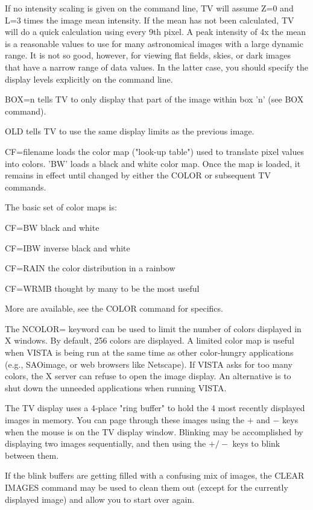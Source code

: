 If no intensity scaling is given on the command line, TV will assume Z=0
and L=3 times the image mean intensity.  If the mean has not been
calculated, TV will do a quick calculation using every 9th pixel.  A peak
intensity of 4x the mean is a reasonable values to use for many
astronomical images with a large dynamic range.  It is not so good,
however, for viewing flat fields, skies, or dark images that have a narrow
range of data values.  In the latter case, you should specify the display
levels explicitly on the command line.
 
BOX=n tells TV to only display that part of the image within box 'n'
(see BOX command).
 
OLD tells TV to use the same display limits as the previous image.
 
CF=filename loads the color map ("look-up table") used to translate
pixel values into colors.  'BW' loads a black and white color map.  Once
the map is loaded, it remains in effect until changed by either the
COLOR or subsequent TV commands.
 
The basic set of color maps is:
\begin{example}
  \item[CF=BW\hfill]{black and white}
  \item[CF=IBW\hfill]{inverse black and white}
  \item[CF=RAIN\hfill]{the color distribution in a rainbow}
  \item[CF=WRMB\hfill]{thought by many to be the most useful}
\end{example}
More are available, see the COLOR command for specifics.

The NCOLOR= keyword can be used to limit the number of colors displayed in
X windows.  By default, 256 colors are displayed.  A limited color map is
useful when VISTA is being run at the same time as other color-hungry
applications (e.g., SAOimage, or web browsers like Netscape).  If VISTA
asks for too many colors, the X server can refuse to open the image
display.  An alternative is to shut down the unneeded applications when
running VISTA.

The TV display uses a 4-place "ring buffer" to hold the 4 most recently
displayed images in memory.  You can page through these images using the
$+$ and $-$ keys when the mouse is on the TV display window.  Blinking may
be accomplished by displaying two images sequentially, and then using the
$+/-$ keys to blink between them.
 
If the blink buffers are getting filled with a confusing mix of images, the
CLEAR IMAGES command may be used to clean them out (except for the
currently displayed image) and allow you to start over again.
 
